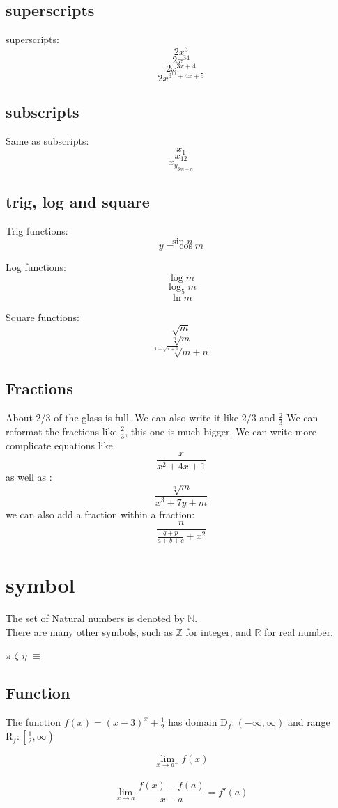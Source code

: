 \documentclass[11pt]{article}
\begin{document}
	\subsection{superscripts}
superscripts:
$$2x^3 $$
$$2x^34 $$
$$2x^{3x + 4} $$
$$2x^{3^m + 4x + 5} $$
	\subsection{subscripts}
Same as subscripts:
$$x_1 $$
$$x_{12}$$
$$x_{y_{3m +n}} $$
	\subsection{trig, log and square}
Trig functions:
$$\sin{n} $$
$$y = \cos{m} $$

Log functions:
$$\log{m} $$
$$\log_5{m} $$
$$\ln{m} $$

Square functions:
$$\sqrt{m}$$
$$\sqrt[n]{m} $$
$$\sqrt[1 + \sqrt{x+1}]{m+n}$$
	\subsection{Fractions}
About 2/3 of the glass is full. We can also write it like $2/3$ and $\frac{2}{3}$ We can reformat the fractions like $\displaystyle{\frac{2}{3}}$, this one is much bigger. We can write more complicate equations like $$\frac{x}{x^2+4x+1}$$ as well as : $$\frac{\sqrt[n]{m}}{x^3+7y+m}$$we can also add a fraction within a fraction:$$\frac{n}{\frac{q+p}{a+b+c} + x^2}$$

\section{symbol}
The set of Natural numbers is denoted by $\mathbb{N}$. \\
There are many other symbols, such as $\mathbb{Z}$ for integer, and $\mathbb{R}$ for real number.

$\pi$
$\zeta$
$\eta$
$\equiv$

	\subsection{Function}
The function $\displaystyle{f(x)=(x-3)^x+\frac{1}{2}}$ has domain $\mathrm{D}_f:(-\infty,\infty)$ and range $\mathrm{R}_f:\left[\frac{1}{2},\infty\right)$

$$\lim \limits_{x \to a^-}f(x)$$\\

$$\displaystyle{\lim \limits_{x \to a}\frac{f(x)-f(a)}{x-a}=f'(a)}$$\\
\end{document}
